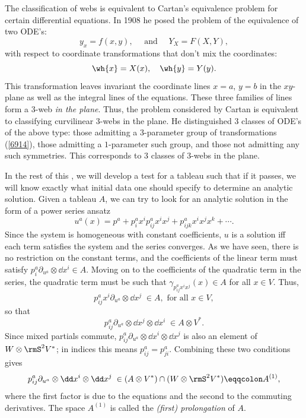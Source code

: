 \begin{hrem*}
    The classification of webs is equivalent to Cartan's equivalence problem for certain differential equations. In 1908 he posed the problem of the equivalence of two ODE's:
    \[y_x=f(x,y),\quad \text{ and }\quad Y_X=F(X,Y),\]
    with respect to coordinate transformations that don't mix the coordinates:
    \[\wh{x}=X(x),\quad \wh{y}=Y(y).\label{6914}\]
    This transformation leaves invariant the coordinate lines $x=a$, $y=b$ in the $xy$-plane as well as the integral lines of the equations. These three families of lines form a $3$-web \emph{in the plane}. Thus, the problem considered by Cartan is equivalent to classifying curvilinear $3$-webs in the plane. He distinguished $3$ classes of ODE's of the above type: those admitting a $3$-parameter group of transformations (\ref{6914}), those admitting a $1$-parameter such group, and those not admitting any such symmetries. This corresponds to $3$ classes of $3$-webs in the plane.
\end{hrem*}

In the rest of this \subsect, we will develop a test for a tableau such that if it passes, we will know exactly what initial data one should specify to determine an analytic solution. Given a tableau $A$, we can try to look for an analytic solution in the form of a power series ansatz
\[u^a(x)=p^a+p^a_i x^i p^a_{ij}x^ix^j+p^a_{ijk}x^ix^jx^k+\cdots.\]
Since the system is homogeneous with constant coefficients, $u$ is a solution iff each term satisfies the system and the series converges. As we have seen, there is no restriction on the constant terms, and the coefficients of the linear term must satisfy $p^a_i\partial_{u^a}\otimes \dd x^i\in A$. Moving on to the coefficients of the quadratic term in the series, the quadratic term must be such that $\gamma_{p^a_{ij}x^ix^j}(x)\in A$ for all $x\in V$. Thus,
\[p^a_{ij}x^i\partial_{u^a}\otimes \dd x^j \; \in A,\text{ for all }x\in V, \]
so that 
\[p^a_{ij}\partial_{u^a}\otimes \dd x^j\otimes \dd x^i \;\in A\otimes V^\ast.\]
Since mixed partials commute, $p^a_{ij}\partial_{u^a}\otimes \dd x^i\otimes \dd x^j$ is also an element of $W\otimes \rmS^2 V^\ast$; in indices this means $p^a_{ij}=p^a_{ji}$. Combining these two conditions gives 
\[p^a_{ij}\partial_{u^a}\otimes \dd x^i\otimes \dd x^j \; \in (A\otimes V^\ast)\cap (W\otimes \rmS^2 V^\ast)\eqqcolon A^{(1)},\]
where the first factor is due to the equations and the second to the commuting derivatives. The space $A^{(1)}$ is called the \emph{(first) prolongation} of $A$.


